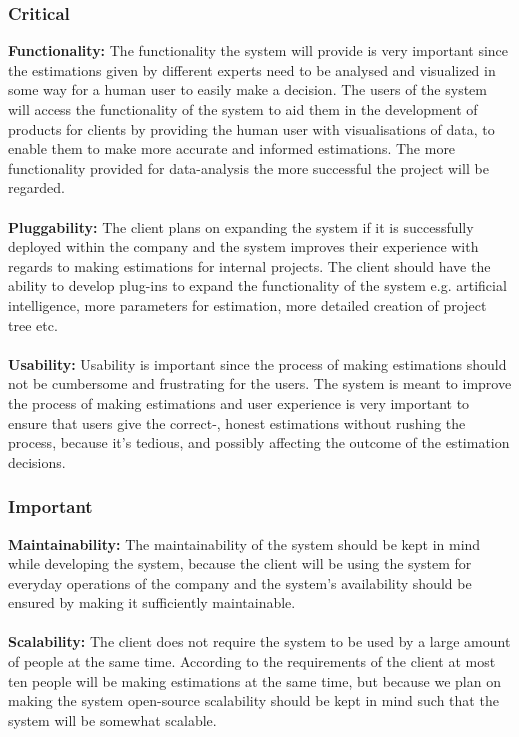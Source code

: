 \subsubsection{Critical}
{\bfseries Functionality:} The functionality the system will provide is very important since the estimations given by different experts need to be analysed and visualized in some way for a human user to easily make a decision. The users of the system will access the functionality of the system to aid them in the development of products for clients by providing the human user with visualisations of data, to enable them to make more accurate and informed estimations. The more functionality provided for data-analysis the more successful the project will be regarded.
\\ \\
{\bfseries Pluggability:} The client plans on expanding the system if it is successfully deployed within the company and the system improves their experience with regards to making estimations for internal projects. The client should have the ability to develop plug-ins to expand the functionality of the system e.g. artificial intelligence, more parameters for estimation, more detailed creation of project tree etc.
\\ \\
{\bfseries Usability:} Usability is important since the process of making estimations should not be cumbersome and frustrating for the users. The system is meant to improve the process of making estimations and user experience is very important to ensure that users give the correct-, honest estimations without rushing the process, because it's tedious, and possibly affecting the outcome of the estimation decisions.

\subsubsection{Important}
{\bfseries Maintainability:} The maintainability of the system should be kept in mind while developing the system, because the client will be using the system for everyday operations of the company and the system's availability should be ensured by making it sufficiently maintainable.
\\ \\
{\bfseries Scalability:} The client does not require the system to be used by a large amount of people at the same time. According to the requirements of the client at most ten people will be making estimations at the same time, but because we plan on making the system open-source scalability should be kept in mind such that the system will be somewhat scalable.